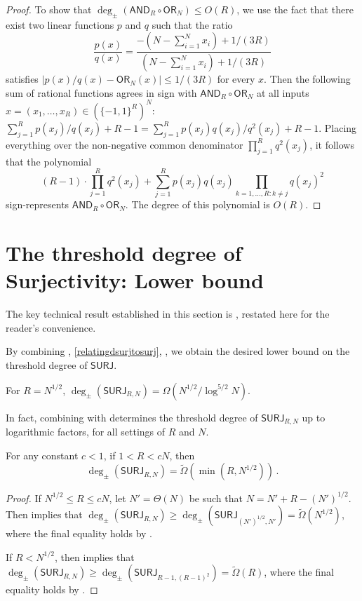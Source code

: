 \documentclass{toc}
\newcommand{\SURJ}{\mathsf{ SURJ}}
\newcommand{\OR}{\mathsf{ OR}}
\newcommand{\bits}{\{-1,1\}}
\newcommand{\AND}{\mathsf{AND}}
\begin{document}
\begin{proof}
	To show that $\deg_{\pm}(\AND_R \circ \OR_N) \leq O(R)$, we use the fact that there exist two linear functions $p$ and $q$ such that the ratio
	$$\frac{p(x)}{q(x)} = \frac{-\left(N - \sum_{i=1}^N x_i\right) + 1/(3R)}{\left(N - \sum_{i=1}^N x_i \right)+ 1/(3R)}$$
	satisfies $|p(x) / q(x) - \OR_N(x)| \le 1 / (3R)$ for every $x$. 
	Then the following sum of rational functions agrees in sign with $\AND_R \circ \OR_N$
	at all inputs $x=(x_1, \dots, x_R) \in \left(\bits^R\right)^N$: $\sum_{j=1}^R p(x_j)/q(x_j) + R-1= \sum_{j=1}^R p(x_j)q(x_j)/q^2(x_j) + R-1$.
	Placing everything over the non-negative common denominator $\prod_{j=1}^R q^2(x_j)$, it follows that the polynomial $$(R-1) \cdot \prod_{j=1}^R q^2(x_j) + \sum_{j=1}^R p(x_j) q(x_j) \prod_{k=1, \dots, R \colon k \neq j} q(x_j)^2$$
	sign-represents $\AND_R \circ \OR_N$. The degree of this polynomial is  $O(R)$.
\end{proof}


\section{The threshold degree of Surjectivity: Lower bound}
\label{s:surj}
The key technical result established in this section is , restated here for the reader's convenience.
\surjthmintro*

By combining , \ref{relatingdsurjtosurj}, , we obtain the desired lower bound on the threshold 
degree of $\SURJ$.
\begin{corollary} \label{surjcor}
	For $R=N^{1/2}$, $\deg_{\pm}(\SURJ_{R, N}) = \Omega(N^{1/2}/\log^{5/2} N)$. 
\end{corollary}

In fact, combining  with  %
determines %
 the threshold degree of $\SURJ_{R, N}$ up to logarithmic factors,
for all settings of $R$ and $N$.

\begin{corollary}
  For any constant $c<1$, if $1 < R < cN$, then
%
\[ \deg_{\pm}\left(\SURJ_{R, N}\right) = 
\tilde{\Omega}\left(\min(R, N^{1/2})\right) \,.\]
\end{corollary}
\begin{proof}
	If $N^{1/2} \leq R \leq cN$, let $N'=\Theta(N)$ be such that $N = N' + R - (N')^{1/2}$. Then  implies that 
	$\deg_{\pm}\left(\SURJ_{R, N}\right) \geq \deg_{\pm}\left(\SURJ_{(N')^{1/2}, N'}\right) = \tilde{\Omega}(N^{1/2})$, where the final
	equality holds by .
	
	If $R < N^{1/2}$, then  
	implies that $\deg_{\pm}(\SURJ_{R, N}) \geq \deg_{\pm}(\SURJ_{R-1, (R-1)^2}) = \tilde{\Omega}(R)$,
	where the final equality holds by .
\end{proof}
\end{document}
